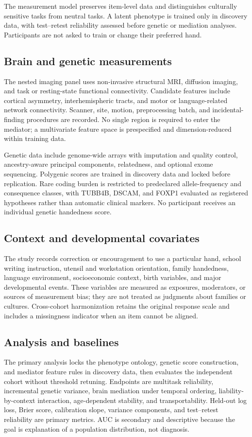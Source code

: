 \documentclass[10pt,conference]{IEEEtran}
\begin{document}
The measurement model preserves item-level data and distinguishes culturally sensitive tasks from neutral tasks. A latent phenotype is trained only in discovery data, with test--retest reliability assessed before genetic or mediation analyses. Participants are not asked to train or change their preferred hand.

\subsection{Brain and genetic measurements}
The nested imaging panel uses non-invasive structural MRI, diffusion imaging, and task or resting-state functional connectivity. Candidate features include cortical asymmetry, interhemispheric tracts, and motor or language-related network connectivity. Scanner, site, motion, preprocessing batch, and incidental-finding procedures are recorded. No single region is required to enter the mediator; a multivariate feature space is prespecified and dimension-reduced within training data.

Genetic data include genome-wide arrays with imputation and quality control, ancestry-aware principal components, relatedness, and optional exome sequencing. Polygenic scores are trained in discovery data and locked before replication. Rare coding burden is restricted to predeclared allele-frequency and consequence classes, with TUBB4B, DSCAM, and FOXP1 evaluated as registered hypotheses rather than automatic clinical markers. No participant receives an individual genetic handedness score.

\subsection{Context and developmental covariates}
The study records correction or encouragement to use a particular hand, school writing instruction, utensil and workstation orientation, family handedness, language environment, socioeconomic context, birth variables, and major developmental events. These variables are measured as exposures, moderators, or sources of measurement bias; they are not treated as judgments about families or cultures. Cross-cohort harmonization retains the original response scale and includes a missingness indicator when an item cannot be aligned.

\subsection{Analysis and baselines}
The primary analysis locks the phenotype ontology, genetic score construction, and mediator feature rules in discovery data, then evaluates the independent cohort without threshold retuning. Endpoints are multitask reliability, incremental genetic variance, brain mediation under temporal ordering, liability-by-context interaction, age-dependent stability, and transportability. Held-out log loss, Brier score, calibration slope, variance components, and test--retest reliability are primary metrics. AUC is secondary and descriptive because the goal is explanation of a population distribution, not diagnosis.
\end{document}
